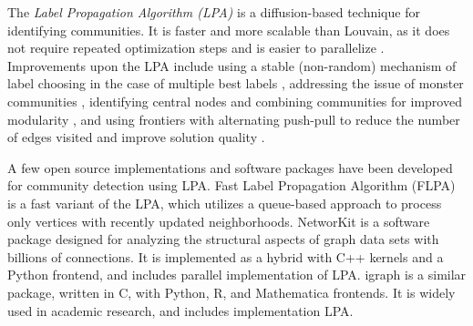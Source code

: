 The \textit{Label Propagation Algorithm (LPA)} is a diffusion-based technique for identifying communities. It is faster and more scalable than Louvain, as it does not require repeated optimization steps and is easier to parallelize \cite{com-newman04, com-raghavan07}. Improvements upon the LPA include using a stable (non-random) mechanism of label choosing in the case of multiple best labels \cite{com-xing14}, addressing the issue of monster communities \cite{com-berahmand18, com-sattari18}, identifying central nodes and combining communities for improved modularity \cite{com-you20}, and using frontiers with alternating push-pull to reduce the number of edges visited and improve solution quality \cite{com-liu20}.

A few open source implementations and software packages have been developed for community detection using LPA. Fast Label Propagation Algorithm (FLPA) \cite{traag2023large} is a fast variant of the LPA, which utilizes a queue-based approach to process only vertices with recently updated neighborhoods. NetworKit \cite{staudt2016networkit} is a software package designed for analyzing the structural aspects of graph data sets with billions of connections. It is implemented as a hybrid with C++ kernels and a Python frontend, and includes parallel implementation of LPA. igraph \cite{csardi2006igraph} is a similar package, written in C, with Python, R, and Mathematica frontends. It is widely used in academic research, and includes implementation LPA.
